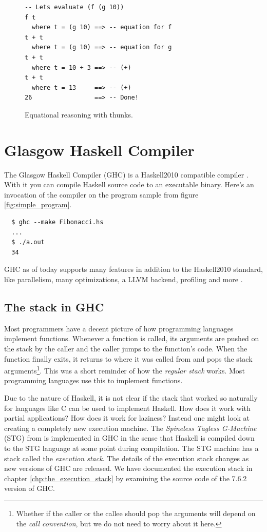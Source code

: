 \begin{figure}
\begin{mdframed}
  \begin{verbatim}
-- Lets evaluate (f (g 10))
f t
  where t = (g 10) ==> -- equation for f
t + t
  where t = (g 10) ==> -- equation for g
t + t
  where t = 10 + 3 ==> -- (+)
t + t
  where t = 13     ==> -- (+)
26                 ==> -- Done!
  \end{verbatim}
  \caption{Equational reasoning with thunks.}
  \label{fig:thunks_er}
\end{mdframed}
\end{figure}

\section{Glasgow Haskell Compiler}

The Glasgow Haskell Compiler (GHC) is a Haskell2010 compatible compiler
\cite{ghc_website}. With it you can compile Haskell source code to an executable
binary. Here's an invocation of the compiler on the program sample from figure \ref{fig:simple_program}.

\begin{verbatim}
  $ ghc --make Fibonacci.hs
  ...
  $ ./a.out
  34
\end{verbatim}

GHC as of today supports many features in addition to the Haskell2010
standard, like parallelism, many optimizations, a LLVM backend, profiling
and more \cite{ghc_website}.

\subsection{The stack in GHC} \label{sec:stack_in_GHC}

Most programmers have a decent picture of how programming languages
implement functions. Whenever a function is called, its arguments are
pushed on the stack by the caller and the caller jumps to the function's
code. When the function finally exits, it returns to where it was called
from and pops the stack arguments\footnote{Whether if the caller or the callee
should pop the arguments will depend on the \emph{call convention}, but
we do not need to worry about it here.}.  This was a short reminder of how
the \emph{regular stack} works. Most programming languages use this to
implement functions.

Due to the nature of Haskell, it is not clear if the stack that worked
so naturally for languages like C can be used to implement Haskell.
How does it work with partial applications? How does it work for
laziness? Instead one might look at creating a completely new execution
machine. The \emph{Spineless Tagless G-Machine} (STG) from
\cite{stg_1992} is implemented in GHC \cite{evalapplyjfp06} in the sense
that Haskell is compiled down to the STG language at some point during compilation.
The STG machine has a stack called the \emph{execution stack}. The details
of the execution stack changes as new versions of GHC are released.
We have documented the execution stack in chapter
\ref{chp:the_execution_stack} by examining the source code of
the 7.6.2 version of GHC.

